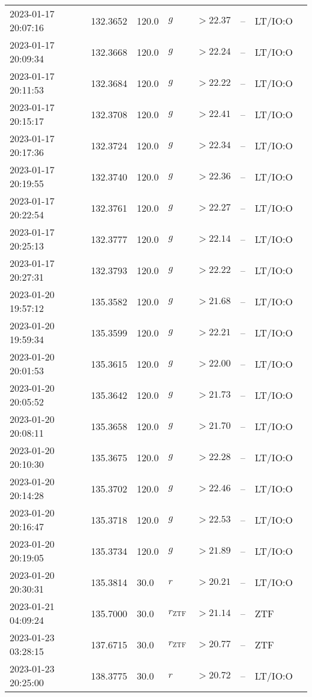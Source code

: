 \documentclass{nature_plusfigure}
\begin{document}
\begin{supplement}
\begin{center}
\begin{longtable}{llllllll}
2023-01-17 20:07:16 & 132.3652 & 120.0 & $g$ & $>22.37$ & -- & LT/IO:O &  \\ 
2023-01-17 20:09:34 & 132.3668 & 120.0 & $g$ & $>22.24$ & -- & LT/IO:O &  \\ 
2023-01-17 20:11:53 & 132.3684 & 120.0 & $g$ & $>22.22$ & -- & LT/IO:O &  \\ 
2023-01-17 20:15:17 & 132.3708 & 120.0 & $g$ & $>22.41$ & -- & LT/IO:O &  \\ 
2023-01-17 20:17:36 & 132.3724 & 120.0 & $g$ & $>22.34$ & -- & LT/IO:O &  \\ 
2023-01-17 20:19:55 & 132.3740 & 120.0 & $g$ & $>22.36$ & -- & LT/IO:O &  \\ 
2023-01-17 20:22:54 & 132.3761 & 120.0 & $g$ & $>22.27$ & -- & LT/IO:O &  \\ 
2023-01-17 20:25:13 & 132.3777 & 120.0 & $g$ & $>22.14$ & -- & LT/IO:O &  \\ 
2023-01-17 20:27:31 & 132.3793 & 120.0 & $g$ & $>22.22$ & -- & LT/IO:O &  \\ 
2023-01-20 19:57:12 & 135.3582 & 120.0 & $g$ & $>21.68$ & -- & LT/IO:O &  \\ 
2023-01-20 19:59:34 & 135.3599 & 120.0 & $g$ & $>22.21$ & -- & LT/IO:O &  \\ 
2023-01-20 20:01:53 & 135.3615 & 120.0 & $g$ & $>22.00$ & -- & LT/IO:O &  \\ 
2023-01-20 20:05:52 & 135.3642 & 120.0 & $g$ & $>21.73$ & -- & LT/IO:O &  \\ 
2023-01-20 20:08:11 & 135.3658 & 120.0 & $g$ & $>21.70$ & -- & LT/IO:O &  \\ 
2023-01-20 20:10:30 & 135.3675 & 120.0 & $g$ & $>22.28$ & -- & LT/IO:O &  \\ 
2023-01-20 20:14:28 & 135.3702 & 120.0 & $g$ & $>22.46$ & -- & LT/IO:O &  \\ 
2023-01-20 20:16:47 & 135.3718 & 120.0 & $g$ & $>22.53$ & -- & LT/IO:O &  \\ 
2023-01-20 20:19:05 & 135.3734 & 120.0 & $g$ & $>21.89$ & -- & LT/IO:O &  \\ 
2023-01-20 20:30:31 & 135.3814 & 30.0 & $r$ & $>20.21$ & -- & LT/IO:O &  \\ 
2023-01-21 04:09:24 & 135.7000 & 30.0 & ${r}_\mathrm{ZTF}$ & $>21.14$ & -- & ZTF &  \\ 
2023-01-23 03:28:15 & 137.6715 & 30.0 & ${r}_\mathrm{ZTF}$ & $>20.77$ & -- & ZTF &  \\ 
2023-01-23 20:25:00 & 138.3775 & 30.0 & $r$ & $>20.72$ & -- & LT/IO:O &  \\ 

\end{longtable}
\end{center}
\end{supplement}
\end{document}
